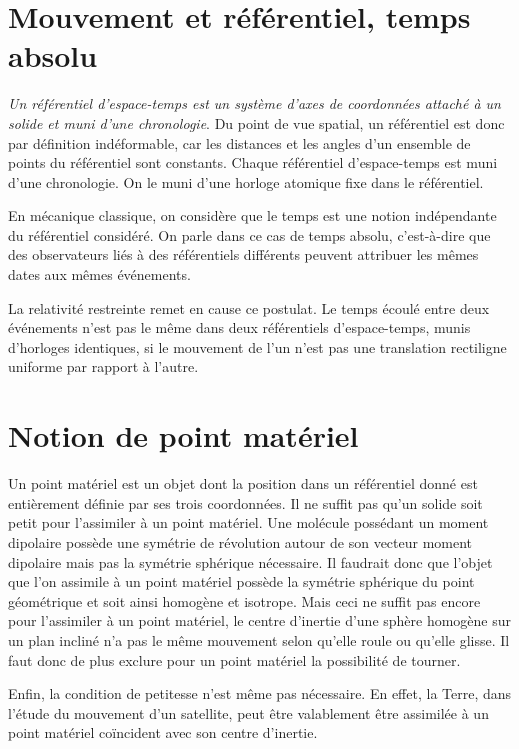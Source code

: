 \section{Mouvement et référentiel, temps absolu}
\label{chap1-sec:mvtetref}
\emph{Un référentiel d'espace-temps est un système d'axes de coordonnées attaché à un solide et muni d'une chronologie}. Du point de vue spatial, un référentiel est donc par définition indéformable, car les distances et les angles d'un ensemble de points du référentiel sont constants. Chaque référentiel d'espace-temps est muni d'une chronologie. On le muni d'une horloge atomique fixe dans le référentiel.

En mécanique classique, on considère que le temps est une notion indépendante du référentiel considéré. On parle dans ce cas de temps absolu, c'est-à-dire que des observateurs liés à des référentiels différents peuvent attribuer les mêmes dates aux mêmes événements.

La relativité restreinte remet en cause ce postulat. Le temps écoulé entre deux événements n'est pas le même dans deux référentiels d'espace-temps, munis d'horloges identiques, si le mouvement de l'un n'est pas une translation rectiligne uniforme par rapport à l'autre.

\section{Notion de point matériel}
\label{chap1-sec:notiondepointmateriel}

Un point matériel est un objet dont la position dans un référentiel donné est entièrement définie par ses trois coordonnées. Il ne suffit pas qu'un solide soit petit pour l'assimiler à un point matériel. Une molécule possédant un moment dipolaire possède une symétrie de révolution autour de son vecteur moment dipolaire mais pas la symétrie sphérique nécessaire. Il faudrait donc que l'objet que l'on assimile à un point matériel possède la symétrie sphérique du point géométrique et soit ainsi homogène et isotrope. Mais ceci ne suffit pas encore pour l'assimiler à un point matériel, le centre d'inertie d'une sphère homogène sur un plan incliné n'a pas le même mouvement selon qu'elle roule ou qu'elle glisse. Il faut donc de plus exclure pour un point matériel la possibilité de tourner.

Enfin, la condition de petitesse n'est même pas nécessaire. En effet, la Terre, dans l'étude du mouvement d'un satellite, peut être valablement être assimilée à un point matériel coïncident avec son centre d'inertie.

